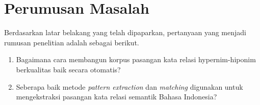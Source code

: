 
%
\section{Perumusan Masalah}
Berdasarkan latar belakang yang telah dipaparkan, pertanyaan yang menjadi rumusan penelitian adalah sebagai berikut.
\begin{enumerate}
	\item Bagaimana cara membangun korpus pasangan kata relasi hypernim-hiponim berkualitas baik secara otomatis?
	\item Seberapa baik metode \textit{pattern extraction} dan \textit{matching} digunakan untuk mengekstraksi pasangan kata relasi semantik Bahasa Indonesia?
\end{enumerate}

%
